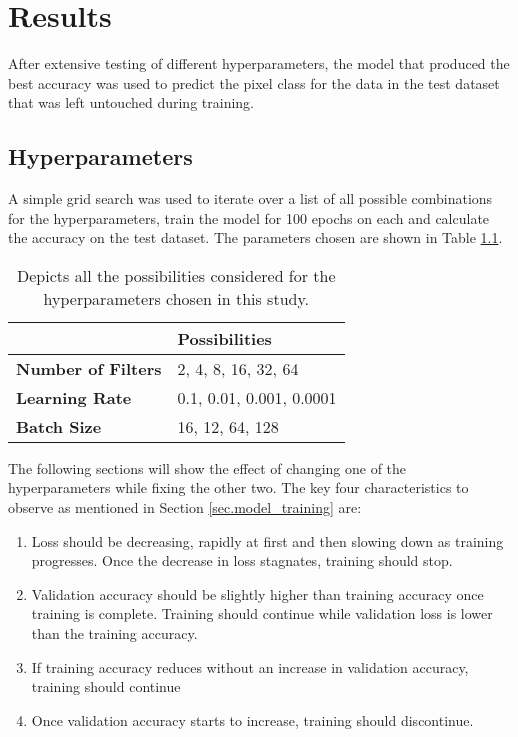 \chapter{Results}
After extensive testing of different hyperparameters, the model that produced the best accuracy was used to predict the pixel class for the data in the test dataset that was left untouched during training. 
\section{Hyperparameters}
A simple grid search was used to iterate over a list of all possible combinations for the hyperparameters, train the model for 100 epochs on each and calculate the accuracy on the test dataset. The parameters chosen are shown in Table \ref{tab.grid_search}. 
\begin{table}[htbp]
\centering 
\begin{tabular}{l|l}
                           & \textbf{Possibilities}   \\ \hline
\textbf{Number of Filters} & 2, 4, 8, 16, 32, 64      \\ 
\textbf{Learning Rate}     & 0.1, 0.01, 0.001, 0.0001 \\ 
\textbf{Batch Size}        & 16, 12, 64, 128     \\ 
\end{tabular}
\caption[Hyperparameter possibilities]{Depicts all the possibilities considered for the hyperparameters chosen in this study.}
\label{tab.grid_search}
\end{table}
The following sections will show the effect of changing one of the hyperparameters while fixing the other two. The key four characteristics to observe as mentioned in Section \ref{sec.model_training} are:
\begin{enumerate}
    \item Loss should be decreasing, rapidly at first and then slowing down as training progresses. Once the decrease in loss stagnates, training should stop.
    \item Validation accuracy should be slightly higher than training accuracy once training is complete. Training should continue while validation loss is lower than the training accuracy.
    \item If training accuracy reduces without an increase in validation accuracy, training should continue
    \item Once validation accuracy starts to increase, training should discontinue. 
\end{enumerate}
